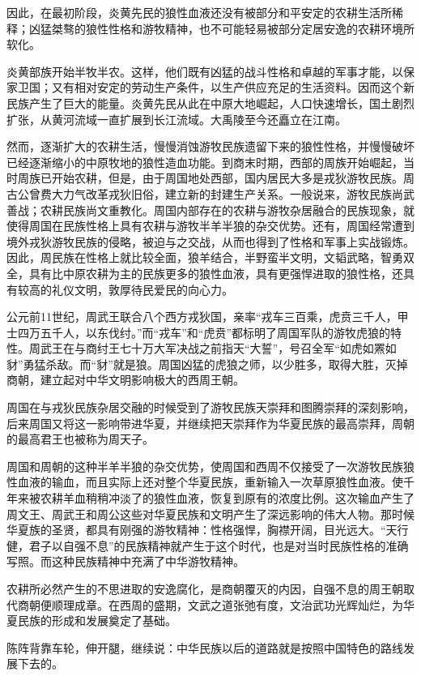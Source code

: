 \par 因此，在最初阶段，炎黄先民的狼性血液还没有被部分和平安定的农耕生活所稀释；凶猛桀骜的狼性性格和游牧精神，也不可能轻易被部分定居安逸的农耕环境所软化。
\par 炎黄部族开始半牧半农。这样，他们既有凶猛的战斗性格和卓越的军事才能，以保家卫国；又有相对安定的劳动生产条件，以生产供应充足的生活资料。因而这个新民族产生了巨大的能量。炎黄先民从此在中原大地崛起，人口快速增长，国土剧烈扩张，从黄河流域一直扩展到长江流域。大禹陵至今还矗立在江南。
\par 然而，逐渐扩大的农耕生活，慢慢消蚀游牧民族遗留下来的狼性性格，并慢慢破坏已经逐渐缩小的中原牧地的狼性造血功能。到商末时期，西部的周族开始崛起，当时周族已开始农耕，但是，由于周国地处西部，国内居民大多是戎狄游牧民族。周古公曾费大力气改革戎狄旧俗，建立新的封建生产关系。一般说来，游牧民族尚武善战；农耕民族尚文重教化。周国内部存在的农耕与游牧杂居融合的民族现象，就使得周国在民族性格上具有农耕与游牧半羊半狼的杂交优势。还有，周国经常遭到境外戎狄游牧民族的侵略，被迫与之交战，从而也得到了性格和军事上实战锻炼。因此，周民族在性格上就比较全面，狼羊结合，半野蛮半文明，文韬武略，智勇双全，具有比中原农耕为主的民族更多的狼性血液，具有更强悍进取的狼性格，还具有较高的礼仪文明，敦厚待民爱民的向心力。
\par 公元前11世纪，周武王联合八个西方戎狄国，亲率“戎车三百乘，虎贲三千人，甲士四万五千人，以东伐纣。”而“戎车”和“虎贲”都标明了周国军队的游牧虎狼的特性。周武王在与商纣王七十万大军决战之前指天“大誓”，号召全军“如虎如罴如豺”勇猛杀敌。而“豺”就是狼。周国凶猛的虎狼之师，以少胜多，取得大胜，灭掉商朝，建立起对中华文明影响极大的西周王朝。
\par 周国在与戎狄民族杂居交融的时候受到了游牧民族天崇拜和图腾崇拜的深刻影响，后来周国又将这一影响带进华夏，并继续把天崇拜作为华夏民族的最高崇拜，周朝的最高君王也被称为周天子。
\par 周国和周朝的这种半羊半狼的杂交优势，使周国和西周不仅接受了一次游牧民族狼性血液的输血，而且实际上还对整个华夏民族，重新输入一次草原狼性血液。使千年来被农耕羊血稍稍冲淡了的狼性血液，恢复到原有的浓度比例。这次输血产生了周文王、周武王和周公这些对华夏民族和文明产生了深远影响的伟大人物。那时候华夏族的圣贤，都具有刚强的游牧精神：性格强悍，胸襟开阔，目光远大。“天行健，君子以自强不息”的民族精神就产生于这个时代，也是对当时民族性格的准确写照。而这种民族精神中充满了中华游牧精神。
\par 农耕所必然产生的不思进取的安逸腐化，是商朝覆灭的内因，自强不息的周王朝取代商朝便顺理成章。在西周的盛期，文武之道张弛有度，文治武功光辉灿烂，为华夏民族的形成和发展奠定了基础。
\par 陈阵背靠车轮，伸开腿，继续说：中华民族以后的道路就是按照中国特色的路线发展下去的。
